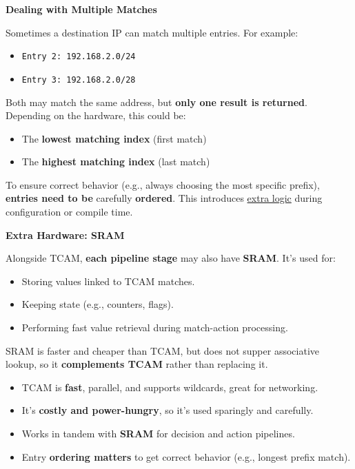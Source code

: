 \highspace
\begin{flushleft}
    \textcolor{Red2}{ \textbf{Dealing with Multiple Matches}}
\end{flushleft}
Sometimes a destination IP can match multiple entries. For example:
\begin{itemize}
    \item \texttt{Entry 2: 192.168.2.0/24}
    \item \texttt{Entry 3: 192.168.2.0/28}
\end{itemize}
Both may match the same address, but \textbf{only one result is returned}. Depending on the hardware, this could be:
\begin{itemize}
    \item The \textbf{lowest matching index} (first match)
    \item The \textbf{highest matching index} (last match)
\end{itemize}
To ensure correct behavior (e.g., always choosing the most specific prefix), \textbf{entries need to be} carefully \textbf{ordered}. This introduces \underline{extra logic} during configuration or compile time.

\highspace
\begin{flushleft}
    \textcolor{Red2}{ \textbf{Extra Hardware: SRAM}}
\end{flushleft}
Alongside TCAM, \textbf{each pipeline stage} may also have \textbf{SRAM}. It's used for:
\begin{itemize}
    \item Storing values linked to TCAM matches.
    \item Keeping state (e.g., counters, flags).
    \item Performing fast value retrieval during match-action processing.
\end{itemize}
SRAM is faster and cheaper than TCAM, but does not supper associative lookup, so it \textbf{complements TCAM} rather than replacing it.

\highspace
\begin{takeawaysbox}
    \begin{itemize}
        \item TCAM is \textbf{fast}, parallel, and supports wildcards, great for networking.
        \item It's \textbf{costly and power-hungry}, so it's used sparingly and carefully.
        \item Works in tandem with \textbf{SRAM} for decision and action pipelines.
        \item Entry \textbf{ordering matters} to get correct behavior (e.g., longest prefix match).
    \end{itemize}
\end{takeawaysbox}